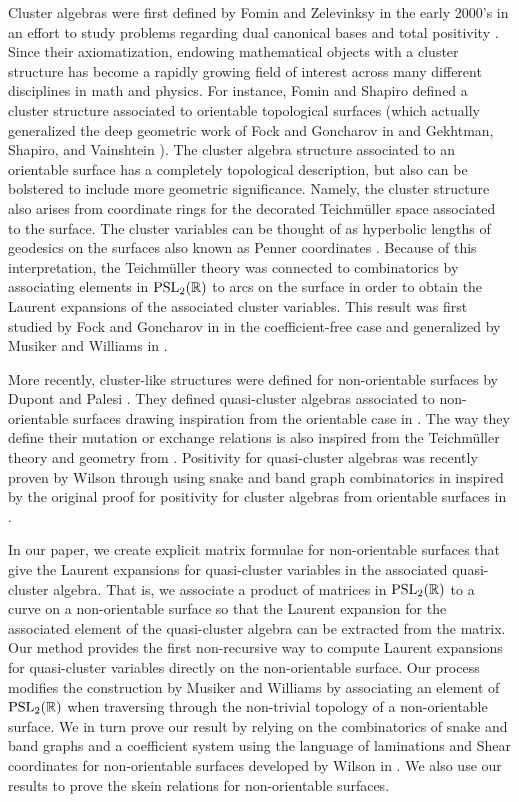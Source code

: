 \documentclass[pdftex]{sigma}
\numberwithin{equation}{section}
\theoremstyle{definition}
\begin{document}
Cluster algebras were first defined by Fomin and Zelevinksy in the early 2000's in an effort to study problems regarding dual canonical bases and total positivity \cite{FZ02}. Since their axiomatization, endowing mathematical objects with a cluster structure has become a rapidly growing field of interest across many different disciplines in math and physics. For instance, Fomin and Shapiro defined a cluster structure associated to orientable topological surfaces (which actually generalized the deep geometric work of Fock and Goncharov in \cite{FG06, FG07} and Gekhtman, Shapiro, and Vainshtein \cite{GSV05}). The cluster algebra structure associated to an orientable surface has a completely topological description, but also can be bolstered to include more geometric significance. Namely, the cluster structure also arises from coordinate rings for the decorated Teichm\"uller space associated to the surface. The cluster variables can be thought of as hyperbolic lengths of geodesics on the surfaces also known as Penner coordinates \cite{P87}. Because of this interpretation, the Teichm\"uller theory was connected to combinatorics by associating elements in ${\rm PSL}_2(\mathbb{R})$ to arcs on the surface in order to obtain the Laurent expansions of the associated cluster variables. This result was first studied by Fock and Goncharov in \cite{FG06, FG07} in the coefficient-free case and generalized by Musiker and Williams in \cite{MW13}.

More recently, cluster-like structures were defined for non-orientable surfaces by Dupont and Palesi \cite{DP15}. They defined quasi-cluster algebras associated to non-orientable surfaces drawing inspiration from the orientable case in \cite{FST08}. The way they define their mutation or exchange relations is also inspired from the Teichm\"uller theory and geometry from \cite{FG06, FG07}. Positivity for quasi-cluster algebras was recently proven by Wilson through using snake and band graph combinatorics in \cite{Wil19} inspired by the original proof for positivity for cluster algebras from orientable surfaces in \cite{MSW11}.

In our paper, we create explicit matrix formulae for non-orientable surfaces that give the Laurent expansions for quasi-cluster variables in the associated quasi-cluster algebra. That is, we associate a product of matrices in ${\rm PSL}_2(\mathbb{R})$ to a curve on a non-orientable surface so that the Laurent expansion for the associated element of the quasi-cluster algebra can be extracted from the matrix. Our method provides the first non-recursive way to compute Laurent expansions for quasi-cluster variables directly on the non-orientable surface. Our process modifies the construction by Musiker and Williams \cite{MW13} by associating an element of ${\rm PSL}_2(\mathbb{R})$ when traversing through the non-trivial topology of a non-orientable surface. We in turn prove our result by relying on the combinatorics of snake and band graphs and a coefficient system using the language of laminations and Shear coordinates for non-orientable surfaces developed by Wilson in \cite{Wil19}. We also use our results to prove the skein relations for non-orientable surfaces.
\end{document}
